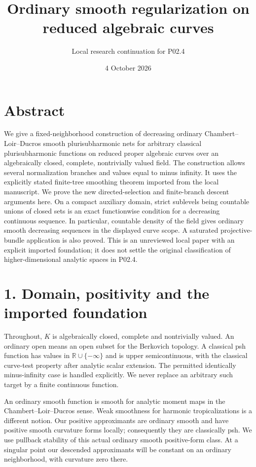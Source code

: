\documentclass[
  11pt,
]{article}
\title{Ordinary smooth regularization on reduced algebraic curves}
\author{Local research continuation for P02.4}
\date{4 October 2026}
\begin{document}
\maketitle

\section{Abstract}\label{abstract}

We give a fixed-neighborhood construction of decreasing ordinary
Chambert--Loir--Ducros smooth plurisubharmonic nets for arbitrary
classical plurisubharmonic functions on reduced proper algebraic curves
over an algebraically closed, complete, nontrivially valued field. The
construction allows several normalization branches and values equal to
minus infinity. It uses the explicitly stated finite-tree smoothing
theorem imported from the local manuscript. We prove the new
directed-selection and finite-branch descent arguments here. On a
compact auxiliary domain, strict sublevels being countable unions of
closed sets is an exact functionwise condition for a decreasing
continuous sequence. In particular, countable density of the field gives
ordinary smooth decreasing sequences in the displayed curve scope. A
saturated projective-bundle application is also proved. This is an
unreviewed local paper with an explicit imported foundation; it does not
settle the original classification of higher-dimensional analytic spaces
in P02.4.

\section{1. Domain, positivity and the imported
foundation}\label{domain-positivity-and-the-imported-foundation}

Throughout, \(K\) is algebraically closed, complete and nontrivially
valued. An ordinary open means an open subset for the Berkovich
topology. A classical psh function has values in
\(\mathbb R\cup\{-\infty\}\) and is upper semicontinuous, with the
classical curve-test property after analytic scalar extension. The
permitted identically minus-infinity case is handled explicitly. We
never replace an arbitrary such target by a finite continuous function.

An ordinary smooth function is smooth for analytic moment maps in the
Chambert--Loir--Ducros sense. Weak smoothness for harmonic
tropicalizations is a different notion. Our positive approximants are
ordinary smooth and have positive smooth curvature forms locally;
consequently they are classically psh. We use pullback stability of this
actual ordinary smooth positive-form class. At a singular point our
descended approximants will be constant on an ordinary neighborhood,
with curvature zero there.
\end{document}
